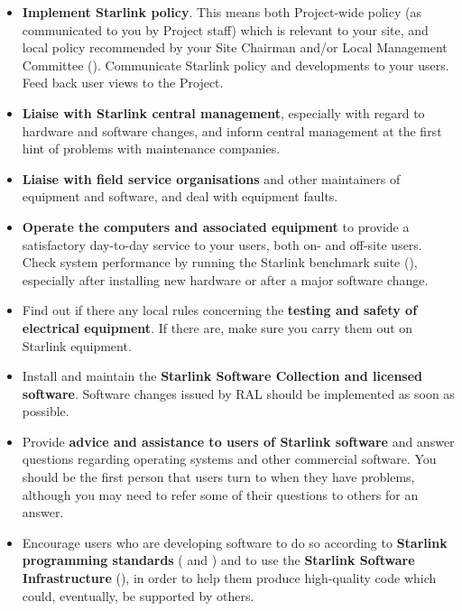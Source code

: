 \begin{itemize}

\item {\bf Implement Starlink policy}.
This means both Project-wide policy (as communicated to you by Project staff)
which is relevant to your site, and local policy recommended by your Site
Chairman and/or Local Management Committee
().
Communicate Starlink policy and developments to your users.
Feed back user views to the Project.

\item {\bf Liaise with Starlink central management}, especially with regard to
hardware and software changes, and inform central management at the first hint
of problems with maintenance companies. 

\item {\bf Liaise with field service organisations} and other
maintainers of equipment and software, and deal with equipment faults.

\item {\bf Operate the computers and associated equipment} to provide a
satisfactory day-to-day service to your users, both on- and off-site users.
Check system performance by running the Starlink benchmark suite
(),
especially after installing new hardware or after a major software change.

\item Find out if there any local rules concerning the {\bf testing and safety
of electrical equipment}.
If there are, make sure you carry them out on Starlink equipment.

\item Install and maintain the {\bf Starlink Software Collection and licensed
software}.
Software changes issued by RAL should be implemented as soon as possible.

\item Provide {\bf advice and assistance to users of Starlink software} and
answer questions regarding operating systems and other commercial software.
You should be the first person that users turn to when they have problems,
although you may need to refer some of their questions to others for an
answer.

\item Encourage users who are developing software to do so according to
{\bf Starlink programming standards}
( and
) and to use the {\bf Starlink Software Infrastructure}
(), in order to help them produce
high-quality code which could, eventually, be supported by others.


\end{itemize}
